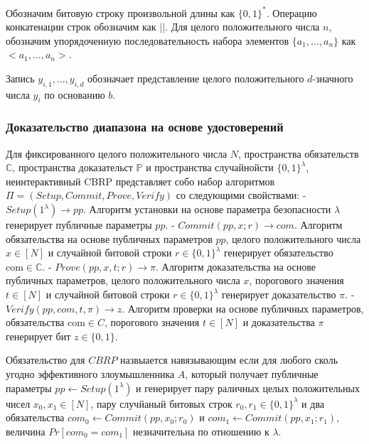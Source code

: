 \documentclass[a4paper]{article}
\newcommand{\C}{\mathbb{C}}
\renewcommand{\P}{\mathbb{P}}
\newcommand{\com}{\text{com}}
\begin{document}
	Обозначим битовую строку произвольной длины как $\{0, 1\}^*$.
	Операцию конкатенации строк обозначим как $||$.
	Для целого положительного числа $n$, обозначим упорядоченную последовательность набора элементов $\{a_1, \dots, a_n\}$ как $<a_1, \dots, a_n>$.

	Запись $y_{i, 1}, \dots, y_{i, d}$ обозначает представление целого положительного $d$-значного числа $y_i$ по основанию $b$.

	\subsubsection{Доказательство диапазона на основе удостоверений} %
	Для фиксированного целого положительного числа $N$, пространства обязательств $\C$, пространства доказательст $\P$ и пространства случайнойсти $\{0, 1\}^\lambda$, неинтерактивный CBRP представляет собо набор алгоритмов $\Pi = (Setup, Commit, Prove, Verify)$ со следующими свойствами:
	- $Setup(1^\lambda) \rightarrow pp$. Алгоритм установки на основе параметра безопасности $\lambda$ генерирует публичные параметры $pp$.
	- $Commit(pp, x; r) \rightarrow com$. Алгоритм обязательства на основе публичных параметров $pp$, целого положительного числа $x \in [N]$ и случайной битовой строки $r \in \{0, 1\}^\lambda$ генерирует обязательство $\com \in \C$.
	- $Prove(pp, x, t; r) \rightarrow \pi$. Алгоритм доказательства на основе публичных параметров, целого положительного числа $x$, порогового значения $t \in [N]$ и случайной битовой строки $r \in \{0, 1\}^\lambda$ генерирует доказательство $\pi$.
	- $Verify(pp, com, t, \pi) \rightarrow z$. Алгоритм проверки на основе публичных параметров, обязательства $\com \in C$, порогового значения $t \in [N]$ и доказательства $\pi$ генерирует бит $z \in \{0, 1\}$.


	Обязательство для $CBRP$ назвыается навязывающим если для любого сколь угодно эффективного злоумышленника $A$, который получает публичные параметры $pp \leftarrow Setup(1^\lambda)$ и генерирует пару раличных целых положительных чисел $x_0, x_1 \in [N]$, пару случйаный битовых строк $r_0, r_1 \in \{0, 1\}^\lambda$ и два обязательства $com_0 \leftarrow Commit(pp, x_0; r_0)$ и $com_1 \leftarrow Commit(pp, x_1; r_1)$, величина $Pr[com_0 = com_1]$ незначительна по отношению к $\lambda$.
\end{document}
